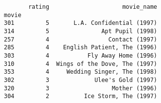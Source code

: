 \documentclass[12pt,fleqn]{article}\usepackage{../common}
\begin{document}
\begin{verbatim}
       rating                     movie_name
movie                                       
301         5       L.A. Confidential (1997)
314         5               Apt Pupil (1998)
257         4                 Contact (1997)
285         4    English Patient, The (1996)
303         4           Fly Away Home (1996)
310         4  Wings of the Dove, The (1997)
353         4     Wedding Singer, The (1998)
302         3             Ulee's Gold (1997)
320         3                  Mother (1996)
304         2          Ice Storm, The (1997)
\end{verbatim}
\end{document}
